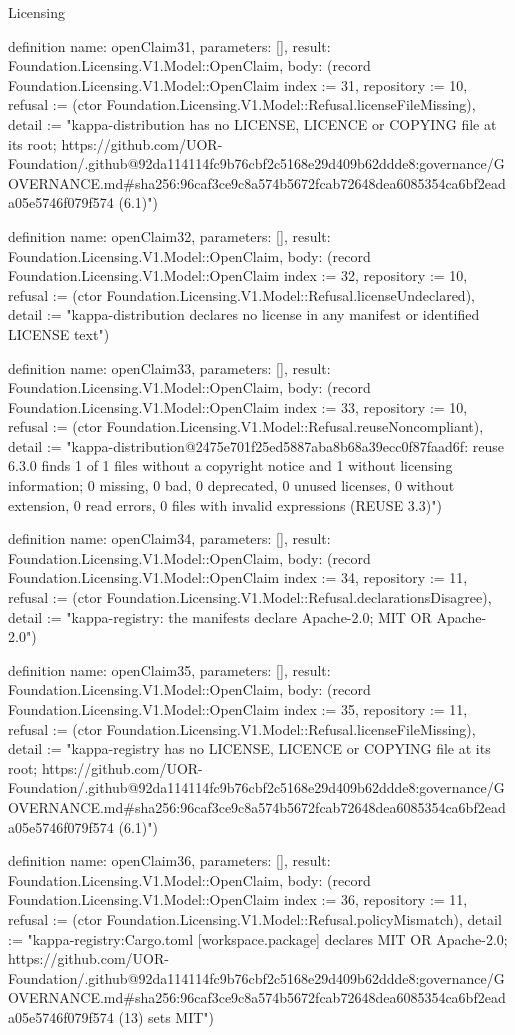 \begin{lexlean}{Licensing}
\begin{semanticmodule}
definition{
  name: openClaim31,
  parameters: [],
  result: Foundation.Licensing.V1.Model::OpenClaim,
  body: (record Foundation.Licensing.V1.Model::OpenClaim {index := 31, repository := 10, refusal := (ctor Foundation.Licensing.V1.Model::Refusal.licenseFileMissing), detail := "kappa-distribution has no LICENSE, LICENCE or COPYING file at its root; https://github.com/UOR-Foundation/.github@92da114114fc9b76cbf2c5168e29d409b62ddde8:governance/GOVERNANCE.md#sha256:96caf3ce9c8a574b5672fcab72648dea6085354ca6bf2eada05e5746f079f574 (6.1)"})
}

definition{
  name: openClaim32,
  parameters: [],
  result: Foundation.Licensing.V1.Model::OpenClaim,
  body: (record Foundation.Licensing.V1.Model::OpenClaim {index := 32, repository := 10, refusal := (ctor Foundation.Licensing.V1.Model::Refusal.licenseUndeclared), detail := "kappa-distribution declares no license in any manifest or identified LICENSE text"})
}

definition{
  name: openClaim33,
  parameters: [],
  result: Foundation.Licensing.V1.Model::OpenClaim,
  body: (record Foundation.Licensing.V1.Model::OpenClaim {index := 33, repository := 10, refusal := (ctor Foundation.Licensing.V1.Model::Refusal.reuseNoncompliant), detail := "kappa-distribution@2475e701f25ed5887aba8b68a39ecc0f87faad6f: reuse 6.3.0 finds 1 of 1 files without a copyright notice and 1 without licensing information; 0 missing, 0 bad, 0 deprecated, 0 unused licenses, 0 without extension, 0 read errors, 0 files with invalid expressions (REUSE 3.3)"})
}

definition{
  name: openClaim34,
  parameters: [],
  result: Foundation.Licensing.V1.Model::OpenClaim,
  body: (record Foundation.Licensing.V1.Model::OpenClaim {index := 34, repository := 11, refusal := (ctor Foundation.Licensing.V1.Model::Refusal.declarationsDisagree), detail := "kappa-registry: the manifests declare Apache-2.0; MIT OR Apache-2.0"})
}

definition{
  name: openClaim35,
  parameters: [],
  result: Foundation.Licensing.V1.Model::OpenClaim,
  body: (record Foundation.Licensing.V1.Model::OpenClaim {index := 35, repository := 11, refusal := (ctor Foundation.Licensing.V1.Model::Refusal.licenseFileMissing), detail := "kappa-registry has no LICENSE, LICENCE or COPYING file at its root; https://github.com/UOR-Foundation/.github@92da114114fc9b76cbf2c5168e29d409b62ddde8:governance/GOVERNANCE.md#sha256:96caf3ce9c8a574b5672fcab72648dea6085354ca6bf2eada05e5746f079f574 (6.1)"})
}

definition{
  name: openClaim36,
  parameters: [],
  result: Foundation.Licensing.V1.Model::OpenClaim,
  body: (record Foundation.Licensing.V1.Model::OpenClaim {index := 36, repository := 11, refusal := (ctor Foundation.Licensing.V1.Model::Refusal.policyMismatch), detail := "kappa-registry:Cargo.toml [workspace.package] declares MIT OR Apache-2.0; https://github.com/UOR-Foundation/.github@92da114114fc9b76cbf2c5168e29d409b62ddde8:governance/GOVERNANCE.md#sha256:96caf3ce9c8a574b5672fcab72648dea6085354ca6bf2eada05e5746f079f574 (13) sets MIT"})
}


\end{semanticmodule}
\end{lexlean}
